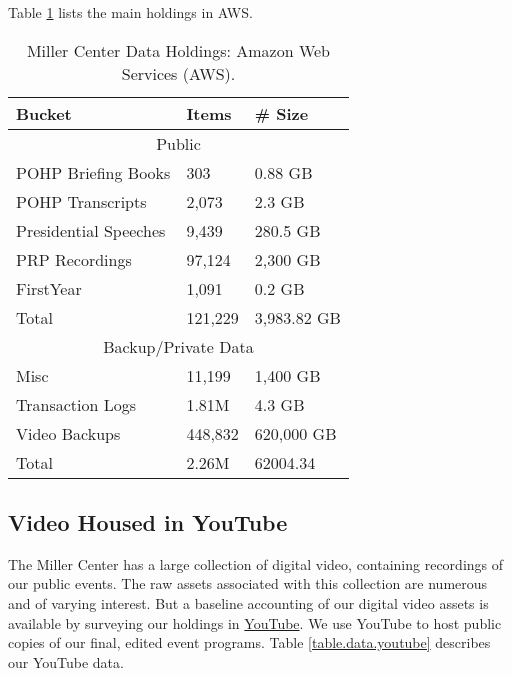 \documentclass[12pt, oneside]{article}   	%
\begin{document}
Table \ref{table.data.aws} lists the main holdings in AWS.  

\begin{table}[htp]
\caption{Miller Center Data Holdings: Amazon Web Services (AWS).}
\begin{center}
\begin{tabular}{l l l }
\toprule
Bucket				&	Items		&	\#  Size	\\
\midrule
						\multicolumn{3}{c}{Public}		\\
\midrule
 POHP Briefing Books	&	303			&	0.88 GB \\
 \midrule
 POHP Transcripts		&	2,073		&	2.3 GB	\\
 \midrule
 Presidential Speeches	&	9,439		&	280.5 GB  \\
 \midrule
 PRP Recordings		&	97,124		&	2,300 GB	\\
 \midrule
 FirstYear				&	1,091		&	0.2 GB	\\
 \bottomrule
  Total				&	121,229		&	3,983.82 GB 	\\
 \bottomrule
 						\multicolumn{3}{c}{Backup/Private Data}		\\
 \midrule
 Misc					&	11,199		&	1,400 GB	\\
\midrule
 Transaction Logs		&	1.81M		&	4.3 GB \\
\midrule
 Video Backups			&	448,832		&	620,000 GB \\
\bottomrule
 Total				&	2.26M		&	62004.34 	\\
\bottomrule

\end{tabular}
\end{center}
\label{table.data.aws}
\end{table}%


\subsection{Video Housed in YouTube}\label{section.data.youtube}
The Miller Center has a large collection of digital video, containing recordings of our public events.  The raw assets associated with this collection are numerous and of varying interest.  But a baseline accounting of our digital video assets is available by surveying our holdings in \href{https://www.youtube.com/@millercenter32}{YouTube}.  We use YouTube to host public copies of our final, edited event programs.  Table \ref{table.data.youtube} describes our YouTube data. 
\end{document}
